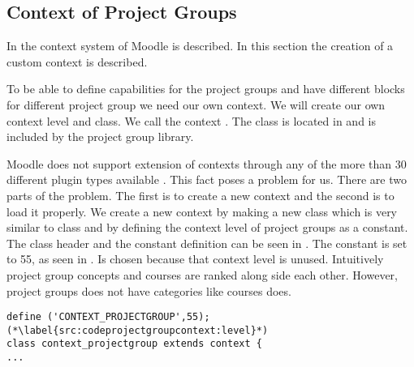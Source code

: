 \subsection{Context of Project Groups}
In   the context system of Moodle is described.
In this section the creation of a custom context is described. 

To be able to define capabilities for the project groups and have different blocks for different project group we need our own context.
We will create our own context level and class.
We call the context . 
The class is located in  and is included by the project group library. 

Moodle does not support extension of contexts through any of the more than 30 different plugin types available \cite{plugin}. 
This fact poses a problem for us.
There are two parts of the problem.
The first is to create a new context and the second is to load it properly. 
We create a new context by making a new class which is very similar to  class and by defining the context level of project groups as a constant. 
The class header and the constant definition can be seen in . 
The constant is set to 55, as seen in .
Is chosen because that context level is unused.
Intuitively project group concepts and courses are ranked along side each other.
However, project groups does not have categories like courses does.

\begin{lstlisting}[style=phpCode, caption=\myCaption{The context\_projectgroup class header and constant definition}, label=src:codeprojectgroupcontext]
define ('CONTEXT_PROJECTGROUP',55); (*\label{src:codeprojectgroupcontext:level}*)
class context_projectgroup extends context {
...
\end{lstlisting}

